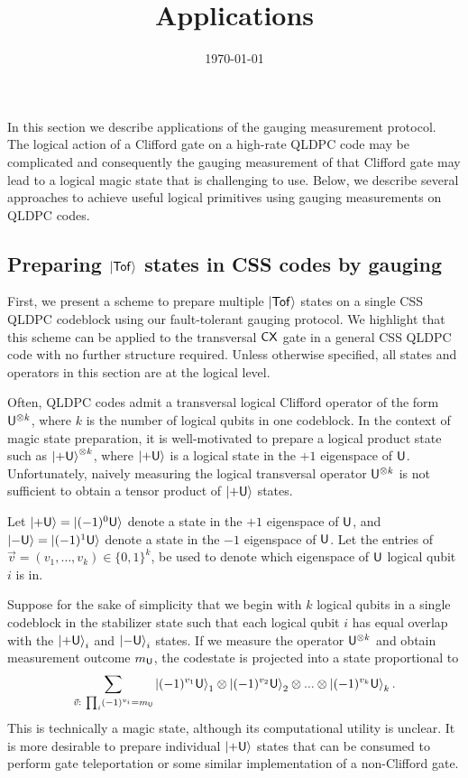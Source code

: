 \documentclass[11pt]{article}
\begin{document}
    \title{Applications}
    \date{\today}
    

    \maketitle
\fi




In this section we describe applications of the gauging measurement protocol. The logical action of a Clifford gate on a high-rate QLDPC code may be complicated and consequently the gauging measurement of that Clifford gate may lead to a logical magic state that is challenging to use. Below, we describe several approaches to achieve useful logical primitives using gauging measurements on QLDPC codes. 

\subsection{Preparing $\ket{\mathsf{Tof}}$ states in CSS codes by gauging}
\label{sec:applicationsA}

First, we present a scheme to prepare multiple $\ket{\mathsf{Tof}}$ states on a single CSS QLDPC codeblock using our fault-tolerant gauging protocol. We highlight that this scheme can be applied to the transversal $\mathsf{CX}$ gate in a general CSS QLDPC code with no further structure required. 
Unless otherwise specified, all states and operators in this section are at the logical level. 


Often, QLDPC codes admit a transversal logical Clifford operator of the form $\mathsf{U}^{\otimes k}$, where $k$ is the number of logical qubits in one codeblock.
In the context of magic state preparation, it is well-motivated to prepare a logical product state such as $\ket{+\mathsf{U}}^{\otimes k}$, where $\ket{+\mathsf{U}}$ is a logical state in the $+1$ eigenspace of $\mathsf{U}$.
Unfortunately, naively measuring the logical transversal operator $\mathsf{U}^{\otimes k}$ is not sufficient to obtain a tensor product of $\ket{+\mathsf{U}}$ states. 

Let $\ket{+\mathsf{U}}=\ket{(-1)^{0}\mathsf{U}}$ denote a state in the $+1$ eigenspace of $\mathsf{U}$, and $\ket{-\mathsf{U}}=\ket{(-1)^1\mathsf{U}}$ denote a state in the $-1$ eigenspace of $\mathsf{U}$. 
Let the entries of $\vec{v} = (v_1, \dots, v_k) \in\{0,1\}^k$, be used to denote which eigenspace of $\mathsf{U}$ logical qubit $i$ is in.

Suppose for the sake of simplicity that we begin with $k$ logical qubits in a single codeblock in the stabilizer state such that each logical qubit $i$ has equal overlap with the $\ket{+\mathsf{U}}_i$ and $\ket{-\mathsf{U}}_i$ states.
If we measure the operator $\mathsf{U}^{\otimes k}$ and obtain measurement outcome $m_{\mathsf{U}}$, the codestate is projected into a state proportional to
\begin{align}
    \sum_{\vec{v}:\ \prod_i(-1)^{v_i}=m_{\mathsf{U}}}\ket{(-1)^{v_1}\mathsf{U}}_1
    \otimes\ket{(-1)^{v_2}\mathsf{U}}_2
    \otimes ...\otimes \ket{(-1)^{v_k}\mathsf{U}}_k.
    \label{eq:entangled-magic}
\end{align}
This is technically a magic state, although its computational utility is unclear. It is more desirable to prepare individual $\ket{+\mathsf{U}}$ states that can be consumed to perform gate teleportation or some similar implementation of a non-Clifford gate.
\end{document}
